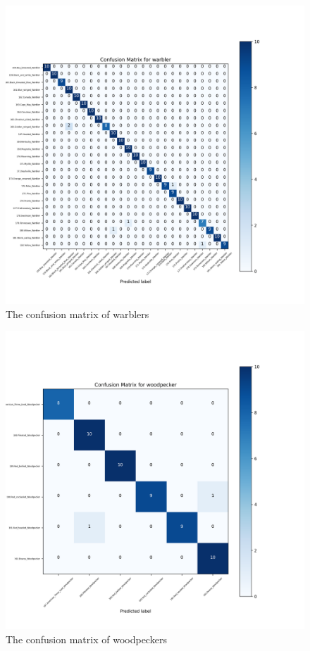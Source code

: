 \documentclass[twocolumn]{extarticle}
\begin{document}
\begin{figure}[H]
\centering
\includegraphics[width=0.95\linewidth]{figure/eval_high_temp_warbler}
\caption{The confusion matrix of warblers}
\label{fig:evalhightempwarbler}
\end{figure}
\begin{figure}[H]
\centering
\includegraphics[width=0.95\linewidth]{figure/eval_high_temp_woodpecker}
\caption{The confusion matrix of woodpeckers}
\label{fig:evalhightempwoodpecker}
\end{figure}
\end{document}
